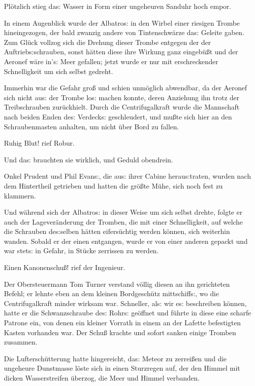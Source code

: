 \documentclass[oneside,12pt]{book}
\newcommand{\s}{s:}
\begin{document}
Pl\"otzlich stieg da{\s} Wasser in Form einer ungeheuren Sanduhr hoch
empor.

In einem Augenblick wurde der {\glqq}Albatro{\s}{\grqq} in den Wirbel
einer riesigen Trombe hineingezogen, der bald zwanzig andere von
Tintenschw\"arze da{\s} Geleite gaben. Zum Gl\"uck vollzog sich die
Drehung dieser Trombe entgegen der der Auftrieb{\s}schrauben, sonst
h\"atten diese ihre Wirkung ganz eingeb\"u{\ss}t und der Aeronef
w\"are in'{\s} Meer gefallen; jetzt wurde er nur mit erschreckender
Schnelligkeit um sich selbst gedreht.

Immerhin war die Gefahr gro{\ss} und schien unm\"oglich abwendbar, da
der Aeronef sich nicht au{\s} der Trombe lo{\s} machen konnte, deren
Anziehung ihn trotz der Treibschrauben zur\"uckhielt. Durch die
Centrifugalkraft wurde die Mannschaft nach beiden Enden de{\s}
Verdeck{\s} geschleudert, und mu{\ss}te sich hier an den
Schraubenmasten anhalten, um nicht \"uber Bord zu fallen.

{\glqq}Ruhig Blut!{\grqq} rief Robur.

Und da{\s} brauchten sie wirklich, und Geduld obendrein.

Onkel Prudent und Phil Evan{\s}, die au{\s} ihrer Cabine
herau{\s}traten, wurden nach dem Hintertheil getrieben und hatten die
gr\"o{\ss}te M\"uhe, sich noch fest zu klammern.

Und w\"ahrend sich der {\glqq}Albatro{\s}{\grqq} in dieser Weise um
sich selbst drehte, folgte er auch der Lagever\"anderung der Tromben,
die mit einer Schnelligkeit, auf welche die Schrauben de{\s}selben
h\"atten eifers\"uchtig werden k\"onnen, sich weiterhin wanden.
Sobald er der einen entgangen, wurde er von einer anderen gepackt und
war stet{\s} in Gefahr, in St\"ucke zerrissen zu werden.

{\glqq}Einen Kanonenschu{\ss}!{\grqq} rief der Ingenieur.

Der Obersteuermann Tom Turner verstand v\"ollig diesen an ihn
gerichteten Befehl; er lehnte eben an dem kleinen Bordgesch\"utz
mittschiff{\s}, wo die Centrifugalkraft minder wirksam war.
Schneller, al{\s} wir e{\s} beschreiben k\"onnen, hatte er die
Schwanzschraube de{\s} Rohr{\s} ge\"offnet und f\"uhrte in diese eine
scharfe Patrone ein, von denen ein kleiner Vorrath in einem an der
Lafette befestigten Kasten vorhanden war. Der Schu{\ss} krachte und
sofort sanken einige Tromben zusammen.

Die Luftersch\"utterung hatte hingereicht, da{\s} Meteor zu
zerrei{\ss}en und die ungeheure Dunstmasse l\"oste sich in einen
Sturzregen auf, der den Himmel mit dicken Wasserstreifen \"uberzog,
die Meer und Himmel verbanden.
\end{document}
